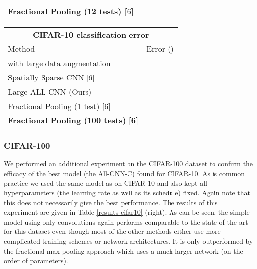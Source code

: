 \documentclass{article} \usepackage{iclr2015,times}
\begin{document}
\begin{table}[h]
\begin{minipage}{0.49\linewidth}
\begin{tabular}{ll}
\textbf{Fractional Pooling (12 tests) [6]}  &  \\
\end{tabular}
\begin{tabular}{ll}
\multicolumn{2}{c}{\bf CIFAR-10 classification error} \\
\multicolumn{1}{l}{Method} & \multicolumn{1}{l}{Error ()} \\
\hline
\multicolumn{2}{l}{with large data augmentation} \\
\hline
Spatially Sparse CNN [6]         &   \\
Large ALL-CNN (Ours)         &    \\
Fractional Pooling (1 test) [6]  &  \\
\textbf{Fractional Pooling (100 tests) [6]}  &  \\
\end{tabular}
\end{minipage}
\end{table}



\subsubsection{CIFAR-100}
We performed an additional experiment on the CIFAR-100 dataset to
confirm the efficacy of the best model (the All-CNN-C) found for
CIFAR-10. As is common practice we used the same model as on CIFAR-10
and also kept all hyperparameters (the learning rate as well as its
schedule) fixed. Again note that this does not necessarily give the
best performance. The results of this experiment are given in Table
\ref{results-cifar10} (right). As can be seen, the simple model using only 
convolutions again performs comparable to the state of the art
for this dataset even though most of the other methods either use more
complicated training schemes or network architectures. 
It is only outperformed by the fractional max-pooling approach \citep{Graham2015} which uses
a much larger network (on the order of  parameters).
\end{document}
